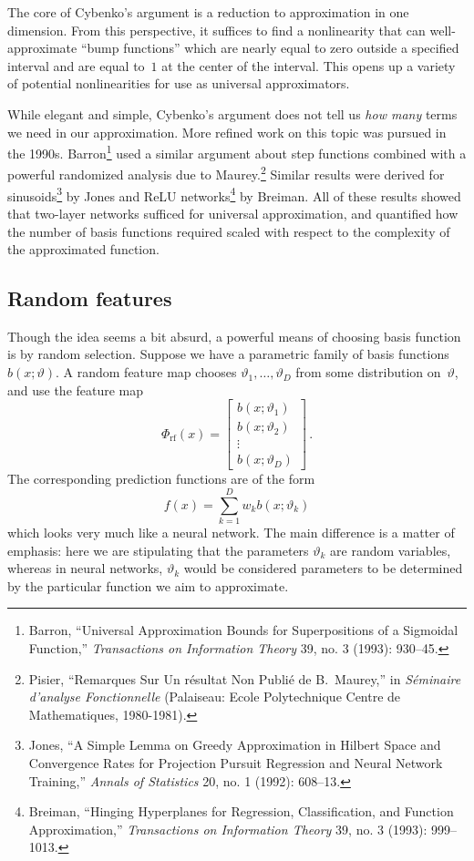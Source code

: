 \documentclass{tufte-book}
\begin{document}
The core of Cybenko's argument is a reduction to approximation in one
dimension. From this perspective, it suffices to find a nonlinearity
that can well-approximate ``bump functions'' which are nearly equal to
zero outside a specified interval and are equal to~\(1\) at the center
of the interval. This opens up a variety of potential nonlinearities for
use as universal approximators.

While elegant and simple, Cybenko's argument does not tell us \emph{how
many} terms we need in our approximation. More refined work on this
topic was pursued in the 1990s. Barron\footnote{Barron, {``Universal
  Approximation Bounds for Superpositions of a Sigmoidal Function,''}
  \emph{Transactions on Information Theory} 39, no. 3 (1993): 930--45.}
used a similar argument about step functions combined with a powerful
randomized analysis due to Maurey.\footnote{Pisier, {``Remarques Sur Un
  résultat Non Publié de {B}.~{M}aurey,''} in \emph{Séminaire d'analyse
  Fonctionnelle} (Palaiseau: Ecole Polytechnique Centre de
  Mathematiques, 1980-1981).} Similar results were derived for
sinusoids\footnote{Jones, {``A Simple Lemma on Greedy Approximation in
  {H}ilbert Space and Convergence Rates for Projection Pursuit
  Regression and Neural Network Training,''} \emph{Annals of Statistics}
  20, no. 1 (1992): 608--13.} by Jones and ReLU networks\footnote{Breiman,
  {``Hinging Hyperplanes for Regression, Classification, and Function
  Approximation,''} \emph{Transactions on Information Theory} 39, no. 3
  (1993): 999--1013.} by Breiman. All of these results showed that
two-layer networks sufficed for universal approximation, and quantified
how the number of basis functions required scaled with respect to the
complexity of the approximated function.

\hypertarget{random-features}{%
\subsection{Random features}\label{random-features}}


Though the idea seems a bit absurd, a powerful means of choosing basis
function is by random selection. Suppose we have a parametric family of
basis functions~\(b(x;\vartheta)\). A random feature map chooses
\(\vartheta_1,\ldots,\vartheta_D\) from some distribution
on~\(\vartheta\), and use the feature map \[
    \Phi_{\text{rf}}(x) = \begin{bmatrix}
        b(x;\vartheta_1) \\b(x;\vartheta_2)\\ \vdots \\b(x;\vartheta_D)
    \end{bmatrix}\,.
\] The corresponding prediction functions are of the form \[
    f(x) = \sum_{k=1}^{D} w_k b(x;\vartheta_k)
\] which looks very much like a neural network. The main difference is a
matter of emphasis: here we are stipulating that the parameters
\(\vartheta_k\) are random variables, whereas in neural networks,
\(\vartheta_k\) would be considered parameters to be determined by the
particular function we aim to approximate.
\end{document}
